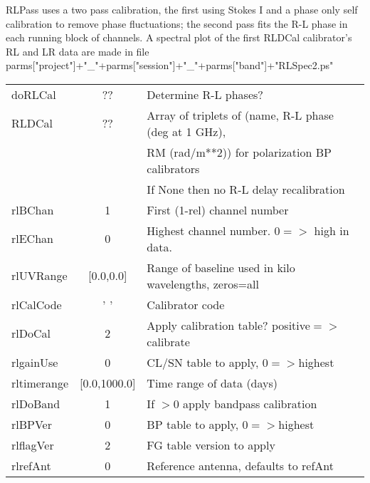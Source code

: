 \documentclass[11pt]{article}
\begin{document}
\begin{enumerate}
RLPass uses a two pass calibration, the first using Stokes I and a
phase only self calibration to remove phase fluctuations; the second
pass fits the R-L phase in each running block of channels.
A spectral plot of the  first RLDCal calibrator's RL and LR data are made in file\\
parms["project"]+"\_"+parms["session"]+"\_"+parms["band"]+"RLSpec2.ps"\\
\begin{center}
\begin{tabular}{|l|c|l|}
\hline
doRLCal  & ??  & Determine R-L phases? \\
RLDCal   & ??  &  Array of triplets of (name, R-L phase (deg at 1 GHz), \\
 & &  RM (rad/m**2)) for polarization BP calibrators\\
 & &  If None then no R-L delay recalibration \\
rlBChan     & 1            & First (1-rel) channel number\\
rlEChan     & 0            & Highest channel number. $0=>$ high in data. \\
rlUVRange   &  [0.0,0.0]   & Range of baseline used in kilo wavelengths, zeros=all\\
rlCalCode   & '  '         & Calibrator code\\
rlDoCal     & 2            & Apply calibration table? positive$=>$calibrate\\
rlgainUse   & 0            & CL/SN table to apply, $0=>$highest\\
rltimerange & [0.0,1000.0] & Time range of data (days)\\
rlDoBand    & 1            & If $> 0$ apply bandpass calibration \\
rlBPVer     & 0            & BP table to apply, $0=>$highest\\
rlflagVer   & 2            & FG table version to apply \\
rlrefAnt    & 0            & Reference antenna, defaults to refAnt\\

\end{tabular}
\end{center}
\end{enumerate}
\end{document}
